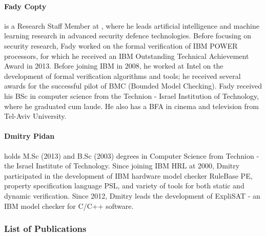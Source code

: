\documentclass[a4paper,11pt]{article}
\begin{document}
\paragraph{Fady Copty} is a Research Staff Member at \IBM, where he leads artificial intelligence and machine learning research in advanced security defence technologies. Before focusing on security research, Fady worked on the formal verification of IBM POWER processors, for which he received an IBM Outstanding Technical Achievement Award in 2013. Before joining IBM in 2008, he worked at Intel on the development of formal verification algorithms and tools; he received several awards for the successful pilot of BMC (Bounded Model Checking). Fady received his BSc in computer science from the Technion - Israel Institution of Technology, where he graduated cum laude. He also has a BFA in cinema and television from Tel-Aviv University.

\paragraph{Dmitry Pidan} holds M.Sc (2013) and B.Sc (2003) degrees in Computer Science
from Technion - the Israel Institute of Technology. Since joining IBM HRL at
2000, Dmitry participated in the development of IBM hardware model checker
RuleBase PE, property specification language PSL, and variety of tools for
both static and dynamic verification. Since 2012, Dmitry leads the development
of ExpliSAT - an IBM model checker for C/C++ software.     

\subsubsection*{List of Publications}
\end{document}
